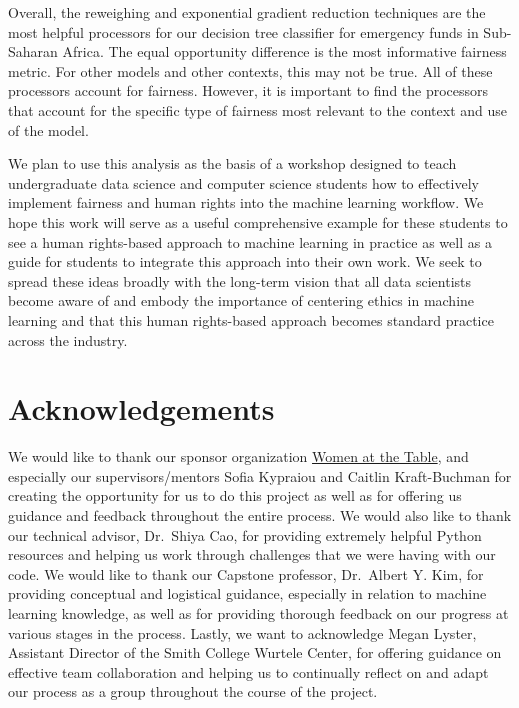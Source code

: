 \documentclass[water,article,submit,moreauthors,pdftex]{mdpi}
\begin{document}
Overall, the reweighing and exponential gradient reduction techniques
are the most helpful processors for our decision tree classifier for
emergency funds in Sub-Saharan Africa. The equal opportunity difference
is the most informative fairness metric. For other models and other
contexts, this may not be true. All of these processors account for
fairness. However, it is important to find the processors that account
for the specific type of fairness most relevant to the context and use
of the model.

We plan to use this analysis as the basis of a workshop designed to
teach undergraduate data science and computer science students how to
effectively implement fairness and human rights into the machine
learning workflow. We hope this work will serve as a useful
comprehensive example for these students to see a human rights-based
approach to machine learning in practice as well as a guide for students
to integrate this approach into their own work. We seek to spread these
ideas broadly with the long-term vision that all data scientists become
aware of and embody the importance of centering ethics in machine
learning and that this human rights-based approach becomes standard
practice across the industry.

\hypertarget{acknowledgements}{%
\section{Acknowledgements}\label{acknowledgements}}

We would like to thank our sponsor organization
\href{https://www.womenatthetable.net/}{Women at the Table}, and
especially our supervisors/mentors Sofia Kypraiou and Caitlin
Kraft-Buchman for creating the opportunity for us to do this project as
well as for offering us guidance and feedback throughout the entire
process. We would also like to thank our technical advisor, Dr.~Shiya
Cao, for providing extremely helpful Python resources and helping us
work through challenges that we were having with our code. We would like
to thank our Capstone professor, Dr.~Albert Y. Kim, for providing
conceptual and logistical guidance, especially in relation to machine
learning knowledge, as well as for providing thorough feedback on our
progress at various stages in the process. Lastly, we want to
acknowledge Megan Lyster, Assistant Director of the Smith College
Wurtele Center, for offering guidance on effective team collaboration
and helping us to continually reflect on and adapt our process as a
group throughout the course of the project.
\end{document}
